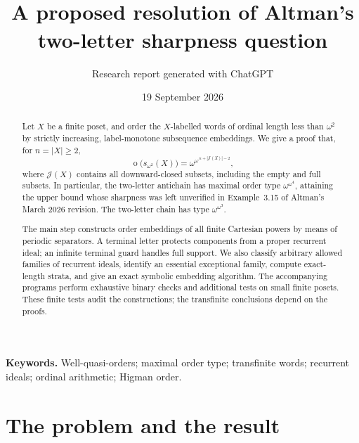 \documentclass[11pt]{article}
\title{\vspace{-9mm}{\color{Ink}\bfseries Guarded periodic blocks and maximal order types\par\medskip
of words below $\boldsymbol{\omega^2}$}\\[9pt]
\large A proposed resolution of Altman's two-letter sharpness question}
\author{Research report generated with ChatGPT}
\date{19 September 2026}
\numberwithin{equation}{section}
\theoremstyle{plain}
\theoremstyle{definition}
\theoremstyle{remark}
\newcommand{\ot}{\operatorname{o}}
\newcommand{\J}{\mathcal J}
\begin{document}
\maketitle
\begin{abstract}
Let $X$ be a finite poset, and order the $X$-labelled words of ordinal length less than $\omega^2$ by strictly increasing, label-monotone subsequence embeddings. We give a proof that, for $n=|X|\geq2$,
\[
 \boxed{\displaystyle
 \ot\bigl(s_{\omega^2}(X)\bigr)
   =\omega^{\omega^{\,n+|\J(X)|-2}} ,}
\]
where $\J(X)$ contains all downward-closed subsets, including the empty and full subsets. In particular, the two-letter antichain has maximal order type $\omega^{\omega^4}$, attaining the upper bound whose sharpness was left unverified in Example~3.15 of Altman's March 2026 revision. The two-letter chain has type $\omega^{\omega^3}$.

The main step constructs order embeddings of all finite Cartesian powers by means of periodic separators. A terminal letter protects components from a proper recurrent ideal; an infinite terminal guard handles full support. We also classify arbitrary allowed families of recurrent ideals, identify an essential exceptional family, compute exact-length strata, and give an exact symbolic embedding algorithm. The accompanying programs perform exhaustive binary checks and additional tests on small finite posets. These finite tests audit the constructions; the transfinite conclusions depend on the proofs.
\end{abstract}

\begin{center}
\end{center}
\vfill
\noindent\textbf{Keywords.} Well-quasi-orders; maximal order type; transfinite words; recurrent ideals; ordinal arithmetic; Higman order.
\newpage
\begingroup
\small
\setlength{\parskip}{0pt}
\tableofcontents
\endgroup
\newpage

\section{The problem and the result}\label{sec:intro}
\end{document}
